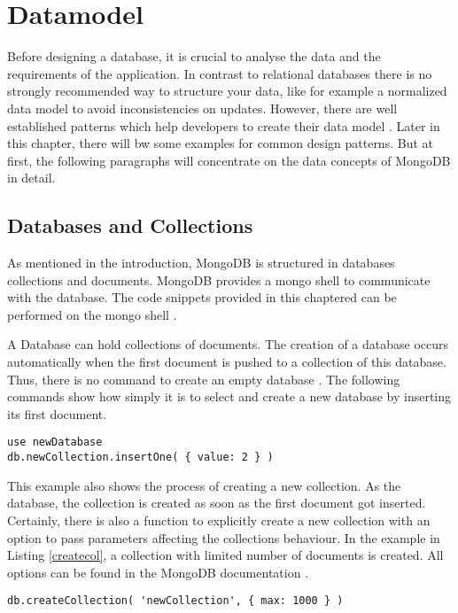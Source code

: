 \section{Datamodel}
Before designing a database, it is crucial to analyse the data and the requirements of the application. In contrast to relational databases there is no strongly recommended way to structure your data, like for example a normalized data model to avoid inconsistencies on updates. However, there are well established patterns which help developers to create their data model \cite{Banker2016}. Later in this chapter, there will bw some examples for common design patterns. But at first, the following paragraphs will concentrate on the data concepts of MongoDB in detail.

\subsection{Databases and Collections}
As mentioned in the introduction, MongoDB is structured in databases collections and documents. MongoDB provides a mongo shell to communicate with the database. The code snippets provided in this chaptered can be performed on the mongo shell \cite{mdbdocu}.

A Database can hold collections of documents. The creation of a database occurs automatically when the first document is pushed to a collection of this database. Thus, there is no command to create an empty database \cite{mdbdocu}. The following commands show how simply it is to select and create a new database by inserting its first document.

\begin{lstlisting}[frame=single, caption=Create Database, label=createdb]
use newDatabase
db.newCollection.insertOne( { value: 2 } )
\end{lstlisting}


This example also shows the process of creating a new collection. As the database, the collection is created as soon as the first document got inserted. Certainly, there is also a function to explicitly create a new collection with an option to pass parameters affecting the collections behaviour. In the example in Listing \ref{createcol}, a collection with limited number of documents is created. All options can be found in the MongoDB documentation \cite{mdbdocu}.

\begin{lstlisting}[frame=single, caption=Create Collection, label=createcol]
db.createCollection( 'newCollection', { max: 1000 } )
\end{lstlisting}

